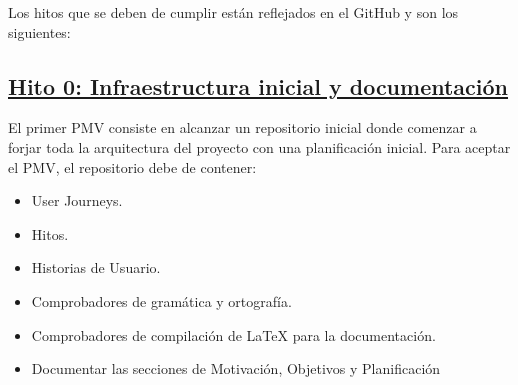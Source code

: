\begin{figure}[!tb]
    \begin{center}
        \label{Figura-Ciudades}
    \end{center}
\end{figure}


Los hitos que se deben de cumplir están reflejados en el GitHub y son los siguientes:

\subsection*{\href{https://github.com/RubenDelgadoPareja/TFG-Triage-Inteligente-Consulta-Medica/milestone/1}{Hito 0: Infraestructura inicial y documentación}}

El primer PMV consiste en alcanzar un repositorio inicial donde comenzar a forjar toda la arquitectura del proyecto con una planificación inicial.
Para aceptar el PMV, el repositorio debe de contener:

\begin{itemize}
    \item{User Journeys.}
    \item{Hitos.}
    \item{Historias de Usuario.}
    \item{Comprobadores de gramática y ortografía.}
    \item{Comprobadores de compilación de LaTeX para la documentación.}
    \item{Documentar las secciones de Motivación, Objetivos y Planificación}
\end{itemize}

